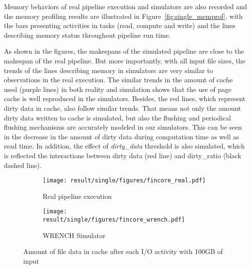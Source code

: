 \documentclass[conference]{IEEEtran}
\begin{document}
			Memory behaviors of real pipeline execution and simulators are also recorded 
			and the memory profiling results are illustrated in Figure~\ref{fig:single_memprof}, 
			with the bars presenting activities in tasks (read, compute and write) 
			and the lines describing memory status throughout pipeline run time. 
			
			As shown in the figures, the makespans of the simulated pipeline are 
			close to the makespan of the real pipeline. 
			But more importantly, with all input file sizes, the trends of the lines describing 
			memory in simulators are very similar to observations in the real execution. 
			The similar trends in the amount of cache used (purple lines) in both reality 
			and simulation shows that the use of page cache is well reproduced in the simulators. 
			Besides, the red lines, which represent dirty data in cache, also 
			follow similar trends. That means not only the amount dirty data written to 
			cache is simulated, but also the flushing and periodical flushing 
			mechanisms are accurately modeled in our simulators. 
			This can be seen in the decrease in the amount of dirty data during computation 
			time as well as read time. 
			In addition, the effect of \textit{dirty\_data}  threshold is also simulated, 
			which is reflected the interactions between dirty data (red line) and dirty\_ratio 
			(black dashed line).
			
			\begin{figure*}
			\begin{subfigure}{\columnwidth}
				\centering
   				\texttt{[image: result/single/figures/fincore\_real.pdf]}
   				\caption{Real pipeline execution}	
   				\label{fig:fincore_real}
			\end{subfigure}	
			\begin{subfigure}{\columnwidth}
				\centering
   				\texttt{[image: result/single/figures/fincore\_wrench.pdf]}
   				\caption{WRENCH Simulator}	
   				\label{fig:fincore_wrench}
			\end{subfigure}	
			\caption{Amount of file data in cache after each I/O activity with 100GB of input}
			\label{fig:fincore}
			\end{figure*}			
\end{document}
